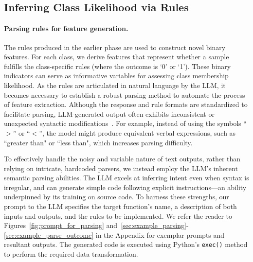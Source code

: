 \subsection{Inferring Class Likelihood via Rules}
\label{Sec:training}

\paragraph{Parsing rules for feature generation.} The rules produced in the earlier phase are used to construct novel binary features. For each class, we derive features that represent whether a sample fulfills the class-specific rules (where the outcome is ‘0’ or ‘1’). These binary indicators can serve as informative variables for assessing class membership likelihood. As the rules are articulated in natural language by the LLM, it becomes necessary to establish a robust parsing method to automate the process of feature extraction. Although the response and rule formats are standardized to facilitate parsing, LLM-generated output often exhibits inconsistent or unexpected syntactic modifications~\cite{kovavc2023large}. For example, instead of using the symbols ``$>$” or ``$<$”, the model might produce equivalent verbal expressions, such as ``greater than" or ``less than", which increases parsing difficulty.

To effectively handle the noisy and variable nature of text outputs, rather than relying on intricate, hardcoded parsers, we instead employ the LLM’s inherent semantic parsing abilities. The LLM excels at inferring intent even when syntax is irregular, and can generate simple code following explicit instructions—an ability underpinned by its training on source code. To harness these strengths, our prompt to the LLM specifies the target function’s name, a description of both inputs and outputs, and the rules to be implemented. We refer the reader to Figures~\ref{fig:prompt_for_parsing} and~\ref{sec:example_parsing}-\ref{sec:example_parse_outcome} in the Appendix for exemplar prompts and resultant outputs. The generated code is executed using Python’s \texttt{exec()} method to perform the required data transformation.

\vspace*{-0.12in}
